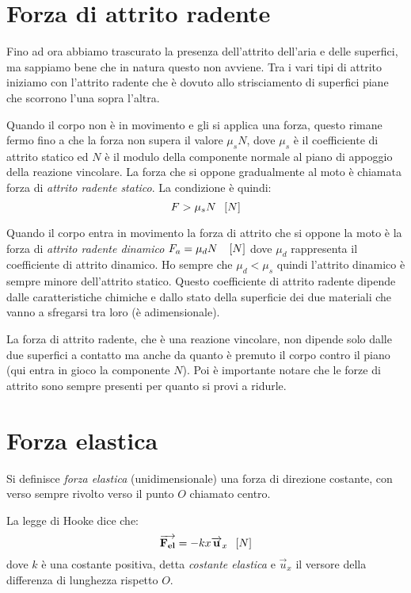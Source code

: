\documentclass[class=book, crop=false, oneside, 12pt]{standalone}
\begin{document}
\section{Forza di attrito radente}

Fino ad ora abbiamo trascurato la presenza dell'attrito dell'aria e delle superfici, ma sappiamo bene che in natura questo non avviene.
Tra i vari tipi di attrito iniziamo con l'attrito radente che è dovuto allo strisciamento di superfici piane che scorrono l'una sopra l'altra.

Quando il corpo non è in movimento e gli si applica una forza, questo rimane fermo fino a che la forza non supera il valore \(\mu_s N\),
dove \(\mu_s\) è il coefficiente di attrito statico ed \(N\) è il modulo della componente normale al piano di appoggio della reazione vincolare.
La forza che si oppone gradualmente al moto è chiamata forza di \emph{attrito radente statico}.
La condizione è quindi:
\begin{equation*}
    F > \mu_s N \hspace{0.2cm} \left[N\right]
\end{equation*}

Quando il corpo entra in movimento la forza di attrito che si oppone la moto è la forza di \emph{attrito radente dinamico} \(F_a = \mu_d N \ \hspace{0.2cm} \left[N\right]\) dove \(\mu_d\) rappresenta il coefficiente di attrito dinamico.
Ho sempre che \(\mu_d < \mu_s\) quindi l'attrito dinamico è sempre minore dell'attrito statico.
Questo coefficiente di attrito radente dipende dalle caratteristiche chimiche e dallo stato della superficie dei due materiali che vanno a sfregarsi tra loro (è adimensionale).

La forza di attrito radente, che è una reazione vincolare, non dipende solo dalle due superfici a contatto ma anche da quanto è premuto il corpo contro il piano (qui entra in gioco la componente \(N\)).
Poi è importante notare che le forze di attrito sono sempre presenti per quanto si provi a ridurle.

\section{Forza elastica}

Si definisce \emph{forza elastica} (unidimensionale) una forza di direzione costante, con verso sempre rivolto verso il punto \(O\) chiamato centro.

La legge di Hooke dice che:
\begin{equation}
    \overrightarrow{F_{el}} = -k x \overrightarrow{u}_x \udm{N} 
\end{equation}
dove \(k\) è una costante positiva, detta \emph{costante elastica} e \(\overrightarrow{u}_x\) il versore della differenza di lunghezza rispetto \(O\).
\end{document}
